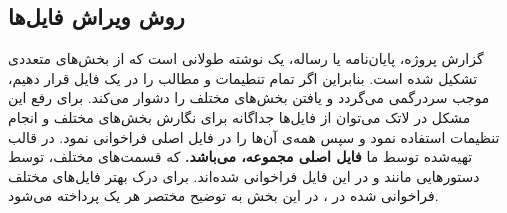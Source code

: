 \subsection{روش ویراش فایل‌ها}\label{sec:edit}
گزارش پروژه، پایان‌نامه یا رساله، یک نوشته طولانی است که از بخش‌های متعددی تشکیل شده است. بنابراین اگر تمام تنطیمات و مطالب را در یک فایل قرار دهیم، موجب سردرگمی می‌گردد و یافتن بخش‌های مختلف را دشوار می‌کند. برای رفع این مشکل در لاتک می‌توان از فایل‌ها جداگانه برای نگارش بخش‌های مختلف و انجام تنظیمات استفاده نمود و سپس همه‌ی آن‌ها را در فایل اصلی فراخوانی نمود.
در قالب تهیه‌شده توسط ما  
\textbf{
	فایل اصلی مجموعه،
	می‌باشد.
}
که قسمت‌های مختلف، توسط دستورهایی مانند 
و
در این فایل فراخوانی شده‌اند.
برای درک بهتر فایل‌های مختلف فراخوانی شده در
،
در این بخش به توضیح مختصر هر یک پرداخته می‌شود.

